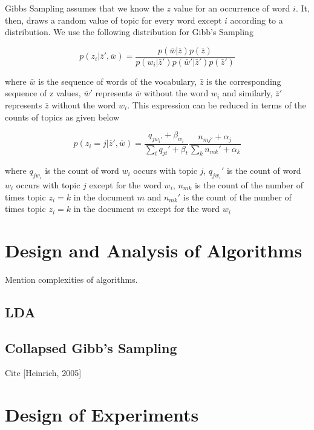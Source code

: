 \documentclass[11pt,a4paper,oneside]{article}
\begin{document}
Gibbs Sampling assumes that we know the $z$ value for an occurrence of word $i$. It, then, draws a random value of topic for every word except $i$ according to a distribution. We use the following distribution for Gibb's Sampling

\begin{equation}
p(z_i|\bar{z}', \bar{w}) = \frac{p(\bar{w} | \bar{z}) p(\bar{z})}{p(w_i|\bar{z}')p(\bar{w}'|\bar{z}')p(\bar{z}')}
\end{equation}

where $\bar{w}$ is the sequence of words of the vocabulary, $\bar{z}$ is the corresponding sequence of z values, $\bar{w}'$ represents $\bar{w}$ without the word $w_i$ and similarly, $\bar{z}'$ represents $\bar{z}$ without the word $w_i$. This expression can be reduced in terms of the counts of topics as given below

\begin{equation}
p(z_i = j | \bar{z}', \bar{w}) = \frac{q_{j w_{i}'} + \beta_{w_i}}{\sum_t{q_{jt}' + \beta_t}}\frac{n_{mj'} + \alpha_j}{\sum_k{n_{mk}' + \alpha_k}}
\end{equation}

where $q_{j w_i}$ is the count of word $w_i$ occurs with topic $j$, $q_{j w_i}'$ is the count of word $w_i$ occurs with topic $j$ except for the word $w_i$, $n_{mk}$ is the count of the number of times topic $z_i = k$ in the document $m$ and $n_{mk}'$ is the count of the number of times topic $z_i = k$ in the document $m$ except for the word $w_i$ 

\section{Design and Analysis of Algorithms}

\label{sec:Algorithms}
Mention complexities of algorithms.

\subsection{LDA}

\subsection{Collapsed Gibb's Sampling}
Cite [Heinrich, 2005]

\section{Design of Experiments}
\label{sec:Experiments}
\end{document}
